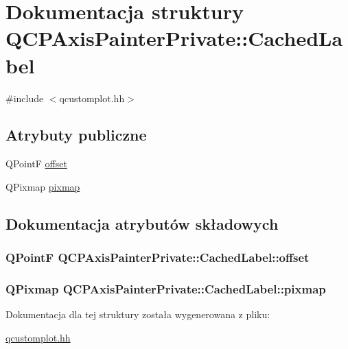 \hypertarget{struct_q_c_p_axis_painter_private_1_1_cached_label}{}\section{Dokumentacja struktury Q\+C\+P\+Axis\+Painter\+Private\+:\+:Cached\+Label}
\label{struct_q_c_p_axis_painter_private_1_1_cached_label}


{\ttfamily \#include $<$qcustomplot.\+hh$>$}

\subsection*{Atrybuty publiczne}
\begin{DoxyCompactItemize}
\item 
Q\+PointF \hyperlink{struct_q_c_p_axis_painter_private_1_1_cached_label_a5f502db71c92e572f1e6f44f62c59d8e}{offset}
\item 
Q\+Pixmap \hyperlink{struct_q_c_p_axis_painter_private_1_1_cached_label_a461597cbd470914a9d24b64d16037a88}{pixmap}
\end{DoxyCompactItemize}


\subsection{Dokumentacja atrybutów składowych}
\subsubsection[{\texorpdfstring{offset}{offset}}]{\setlength{\rightskip}{0pt plus 5cm}Q\+PointF Q\+C\+P\+Axis\+Painter\+Private\+::\+Cached\+Label\+::offset}\hypertarget{struct_q_c_p_axis_painter_private_1_1_cached_label_a5f502db71c92e572f1e6f44f62c59d8e}{}\label{struct_q_c_p_axis_painter_private_1_1_cached_label_a5f502db71c92e572f1e6f44f62c59d8e}
\subsubsection[{\texorpdfstring{pixmap}{pixmap}}]{\setlength{\rightskip}{0pt plus 5cm}Q\+Pixmap Q\+C\+P\+Axis\+Painter\+Private\+::\+Cached\+Label\+::pixmap}\hypertarget{struct_q_c_p_axis_painter_private_1_1_cached_label_a461597cbd470914a9d24b64d16037a88}{}\label{struct_q_c_p_axis_painter_private_1_1_cached_label_a461597cbd470914a9d24b64d16037a88}


Dokumentacja dla tej struktury została wygenerowana z pliku\+:\begin{DoxyCompactItemize}
\item 
\hyperlink{qcustomplot_8hh}{qcustomplot.\+hh}\end{DoxyCompactItemize}

